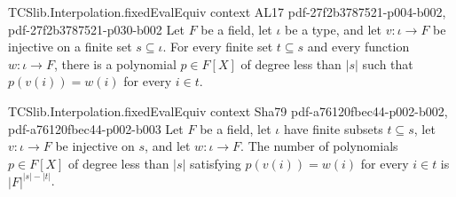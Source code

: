 \begin{theorem}
\label{TCSlib.Interpolation.surjective_eval_of_subset}
\leanok
\proofstep
  {TCSlib.Interpolation.fixedEvalEquiv}
  {context}
  {AL17}
  {pdf-27f2b3787521-p004-b002,
    pdf-27f2b3787521-p030-b002}
Let $F$ be a field, let $\iota$ be a type, and let $v:\iota\to F$ be injective on a
finite set $s\subseteq\iota$. For every finite set $t\subseteq s$ and every function
$w:\iota\to F$, there is a polynomial $p\in F[X]$ of degree less than $|s|$ such that
$p(v(i))=w(i)$ for every $i\in t$.
\end{theorem}

\begin{theorem}
\label{TCSlib.Interpolation.natCard_degreeLT_eval_eq}
\leanok
\proofstep
  {TCSlib.Interpolation.fixedEvalEquiv}
  {context}
  {Sha79}
  {pdf-a76120fbec44-p002-b002,
    pdf-a76120fbec44-p002-b003}
Let $F$ be a field, let $\iota$ have finite subsets $t\subseteq s$, let $v:\iota\to F$
be injective on $s$, and let $w:\iota\to F$. The number of polynomials $p\in F[X]$ of
degree less than $|s|$ satisfying $p(v(i))=w(i)$ for every $i\in t$ is $|F|^{|s|-|t|}$.
\end{theorem}
